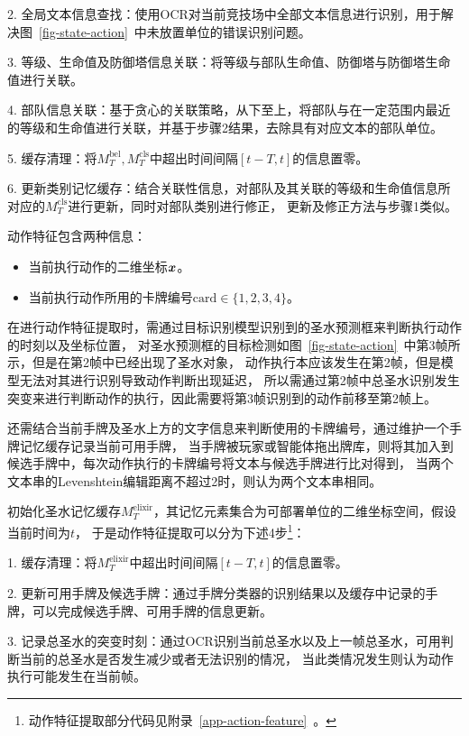 2. 全局文本信息查找：使用OCR对当前竞技场中全部文本信息进行识别，用于解决图~\ref{fig-state-action}~中未放置单位的错误识别问题。

3. 等级、生命值及防御塔信息关联：将等级与部队生命值、防御塔与防御塔生命值进行关联。

4. 部队信息关联：基于贪心的关联策略，从下至上，将部队与在一定范围内最近的等级和生命值进行关联，并基于步骤2结果，去除具有对应文本的部队单位。

5. 缓存清理：将$M_T^{\text{bel}},M_T^{\text{cls}}$中超出时间间隔$[t-T,t]$的信息置零。

6. 更新类别记忆缓存：结合关联性信息，对部队及其关联的等级和生命值信息所对应的$M_T^{\text{cls}}$进行更新，同时对部队类别进行修正，
更新及修正方法与步骤1类似。

\label{sub-sec-action}
动作特征包含两种信息：
\begin{itemize}
  \item 当前执行动作的二维坐标$\boldsymbol{x}$。
  \item 当前执行动作所用的卡牌编号$\text{card}\in\{1,2,3,4\}$。
\end{itemize}

在进行动作特征提取时，需通过目标识别模型识别到的圣水预测框来判断执行动作的时刻以及坐标位置，
对圣水预测框的目标检测如图~\ref{fig-state-action}~中第3帧所示，但是在第2帧中已经出现了圣水对象，
动作执行本应该发生在第2帧，但是模型无法对其进行识别导致动作判断出现延迟，
所以需通过第2帧中总圣水识别发生突变来进行判断动作的执行，因此需要将第3帧识别到的动作前移至第2帧上。

还需结合当前手牌及圣水上方的文字信息来判断使用的卡牌编号，通过维护一个手牌记忆缓存记录当前可用手牌，
当手牌被玩家或智能体拖出牌库，则将其加入到候选手牌中，每次动作执行的卡牌编号将文本与候选手牌进行比对得到，
当两个文本串的Levenshtein编辑距离不超过2时，则认为两个文本串相同。

初始化圣水记忆缓存$M_{T}^{\text{elixir}}$，其记忆元素集合为可部署单位的二维坐标空间，假设当前时间为$t$，
于是动作特征提取可以分为下述4步\footnote{动作特征提取部分代码见附录~\ref{app-action-feature}~。}：

1. 缓存清理：将$M_{T}^{\text{elixir}}$中超出时间间隔$[t-T,t]$的信息置零。

2. 更新可用手牌及候选手牌：通过手牌分类器的识别结果以及缓存中记录的手牌，可以完成候选手牌、可用手牌的信息更新。

3. 记录总圣水的突变时刻：通过OCR识别当前总圣水以及上一帧总圣水，可用判断当前的总圣水是否发生减少或者无法识别的情况，
当此类情况发生则认为动作执行可能发生在当前帧。

